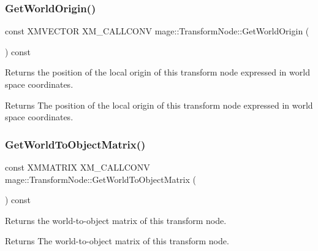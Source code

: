 \subsubsection{\texorpdfstring{Get\+World\+Origin()}{GetWorldOrigin()}}
{\footnotesize\ttfamily const X\+M\+V\+E\+C\+T\+OR X\+M\+\_\+\+C\+A\+L\+L\+C\+O\+NV mage\+::\+Transform\+Node\+::\+Get\+World\+Origin (\begin{DoxyParamCaption}{ }\end{DoxyParamCaption}) const\hspace{0.3cm}{\ttfamily [noexcept]}}

Returns the position of the local origin of this transform node expressed in world space coordinates.

\begin{DoxyReturn}{Returns}
The position of the local origin of this transform node expressed in world space coordinates. 
\end{DoxyReturn}
\hypertarget{classmage_1_1_transform_node_a09566d36553dcf4bb832df5b7c9a1745}{}\label{classmage_1_1_transform_node_a09566d36553dcf4bb832df5b7c9a1745} 
\subsubsection{\texorpdfstring{Get\+World\+To\+Object\+Matrix()}{GetWorldToObjectMatrix()}}
{\footnotesize\ttfamily const X\+M\+M\+A\+T\+R\+IX X\+M\+\_\+\+C\+A\+L\+L\+C\+O\+NV mage\+::\+Transform\+Node\+::\+Get\+World\+To\+Object\+Matrix (\begin{DoxyParamCaption}{ }\end{DoxyParamCaption}) const\hspace{0.3cm}{\ttfamily [noexcept]}}

Returns the world-\/to-\/object matrix of this transform node.

\begin{DoxyReturn}{Returns}
The world-\/to-\/object matrix of this transform node. 
\end{DoxyReturn}
\hypertarget{classmage_1_1_transform_node_ae8c6162b3715c2065c31228cb06c457b}{}\label{classmage_1_1_transform_node_ae8c6162b3715c2065c31228cb06c457b} 
